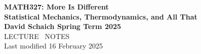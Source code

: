 \documentclass[12 pt]{article} %
\begin{document}
\thispagestyle{empty}
\begin{center}
  {\LARGE \textbf{MATH327: More Is Different}} \\[6 pt]
  {\Large \textbf{Statistical Mechanics, Thermodynamics, and All That}} \\[6 pt]
  \textbf{David Schaich \qquad\qquad\qquad\qquad Spring Term 2025} \\[48 pt]
  {\LARGE LECTURE \ NOTES} \\[6 pt]
  Last modified 16 February 2025
\end{center}
\renewcommand{\contentsname}{}
\setcounter{tocdepth}{1}
\tableofcontents



\newpage


\newpage


\newpage


\newpage


\newpage


\newpage


\newpage


\newpage


\newpage


\newpage


\newpage




\end{document}
